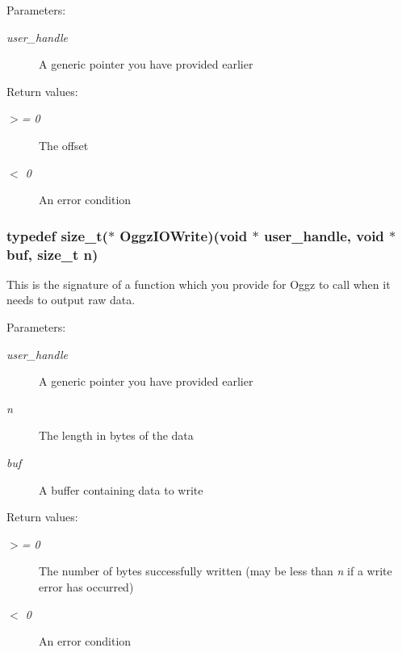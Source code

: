 \begin{Desc}
\item[Parameters:]
\begin{description}
\item[{\em user\_\-handle}]A generic pointer you have provided earlier \end{description}
\end{Desc}
\begin{Desc}
\item[Return values:]
\begin{description}
\item[{\em $>$= 0}]The offset \item[{\em $<$  0}]An error condition \end{description}
\end{Desc}
\subsubsection{\setlength{\rightskip}{0pt plus 5cm}typedef size\_\-t($\ast$ {\bf Oggz\-IOWrite})(void $\ast$ user\_\-handle, void $\ast$ buf, size\_\-t n)}\label{oggz__io_8h_a1}


This is the signature of a function which you provide for Oggz to call when it needs to output raw data. 

\begin{Desc}
\item[Parameters:]
\begin{description}
\item[{\em user\_\-handle}]A generic pointer you have provided earlier \item[{\em n}]The length in bytes of the data \item[{\em buf}]A buffer containing data to write \end{description}
\end{Desc}
\begin{Desc}
\item[Return values:]
\begin{description}
\item[{\em $>$= 0}]The number of bytes successfully written (may be less than {\em n\/} if a write error has occurred) \item[{\em $<$  0}]An error condition \end{description}
\end{Desc}



